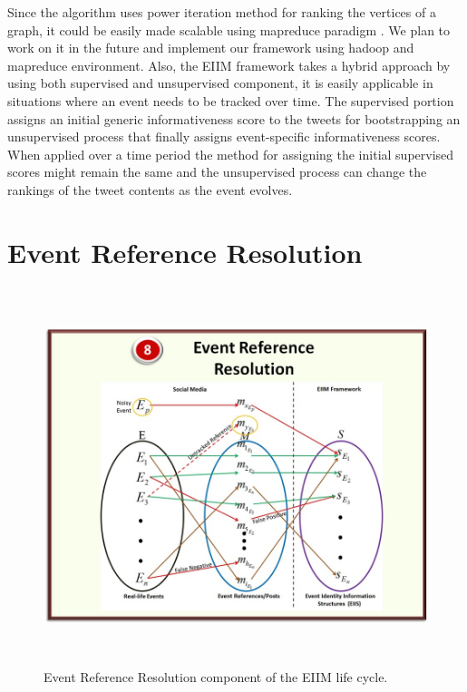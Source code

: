Since the algorithm uses power iteration method for ranking the vertices of a graph, it could be easily made scalable using mapreduce paradigm \cite{lin2010design}. We plan to work on it in the future and implement our framework using hadoop and mapreduce environment. Also, the EIIM framework takes a hybrid approach by using both supervised and unsupervised component, it is easily applicable in situations where an event needs to be tracked over time. The supervised portion assigns an initial generic informativeness score to the tweets for bootstrapping an unsupervised process that finally assigns event-specific informativeness scores. When applied over a time period the method for assigning the initial supervised scores might remain the same and the unsupervised process can change the rankings of the tweet contents as the event evolves. 


\section{Event Reference Resolution}

\begin{figure}[htbp]
  \caption{Event Reference Resolution component of the EIIM life cycle.}
  \centering
    \includegraphics[width=14cm,height=11cm]{Figures/EventReferenceResolution.jpg}
\end{figure}

